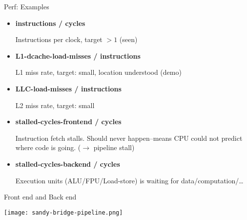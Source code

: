 \documentclass[english,compress]{beamer}
\begin{document}
\begin{frame}{Perf: Examples}
  \begin{itemize}
    \item \textbf{instructions / cycles}

      \medskip
      Instructions per clock, target $>1$ (seen)

    \item \textbf{L1-dcache-load-misses / instructions}

      \medskip
      L1 miss rate, target: small, location understood (demo)

    \item \textbf{LLC-load-misses / instructions}

      \medskip
      L2 miss rate, target: small

    \item \textbf{stalled-cycles-frontend / cycles}

      \medskip
      Instruction fetch stalls. Should never happen--means CPU could
      not predict where code is going. ($\rightarrow$ pipeline stall)

    \item \textbf{stalled-cycles-backend / cycles}

      \medskip
      Execution units (ALU/FPU/Load-store) is waiting for data/computation/\dots
  \end{itemize}
  \uncover<+->{}
\end{frame}
\begin{frame}{Front end and Back end}
  \begin{center}
  \texttt{[image: sandy-bridge-pipeline.png]}
  \end{center}

\end{frame}
\end{document}
